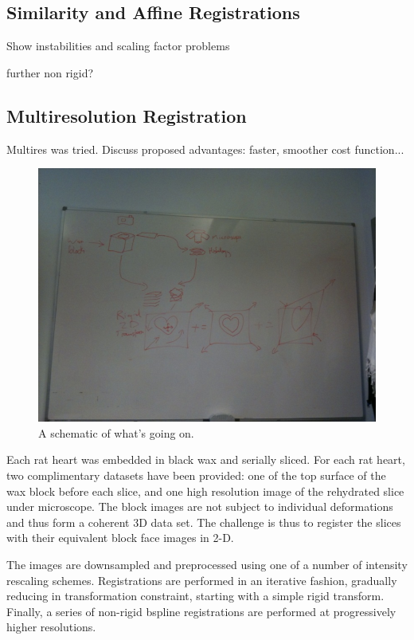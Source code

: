   \subsection{Similarity and Affine Registrations} %
  \label{sub:similarity_and_affine_registrations}
    Show instabilities and scaling factor problems
    
    further non rigid?
  
  \subsection{Multiresolution Registration} %
  \label{sub:multiresolution_registration}
    Multires was tried. Discuss proposed advantages: faster, smoother cost function...
  
  \begin{figure}[htbp]
    \centering
    \includegraphics[height=0.7\textwidth]{Ch6/Figs/process_diagram}
    \caption{A schematic of what's going on.}
  \end{figure}
  
  Each rat heart was embedded in black wax and serially sliced. For each rat heart, two complimentary datasets have been provided: one of the top surface of the wax block before each slice, and one high resolution image of the rehydrated slice under microscope. The block images are not subject to individual deformations and thus form a coherent 3D data set. The challenge is thus to register the slices with their equivalent block face images in 2-D.
  
  The images are downsampled and preprocessed using one of a number of intensity rescaling schemes. Registrations are performed in an iterative fashion, gradually reducing in transformation constraint, starting with a simple rigid transform. Finally, a series of non-rigid bspline registrations are performed at progressively higher resolutions.
   
